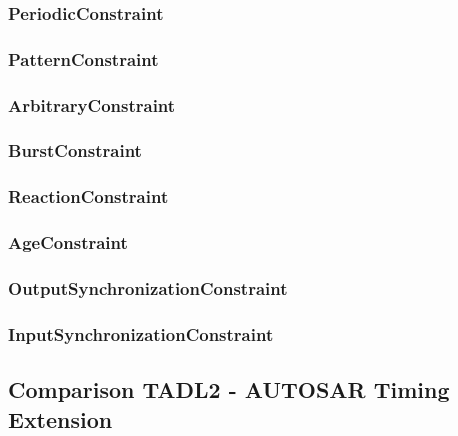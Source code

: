 	\subsubsection{PeriodicConstraint}
	\subsubsection{PatternConstraint}
	\subsubsection{ArbitraryConstraint}
	\subsubsection{BurstConstraint}
	\subsubsection{ReactionConstraint}
	\subsubsection{AgeConstraint}
	\subsubsection{OutputSynchronizationConstraint}
	\subsubsection{InputSynchronizationConstraint}
			
\subsection{Comparison TADL2 - AUTOSAR Timing Extension}
\label{comparisonConstraints}
	

